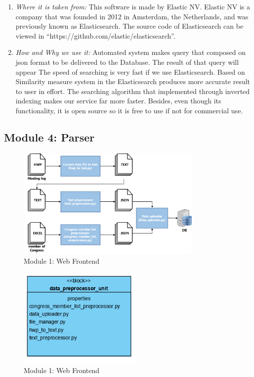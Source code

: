 \documentclass[conference]{IEEEtran}
\begin{document}
\begin{enumerate}
\begin{enumerate}
\end{enumerate}


   \item \textit{Where it is taken from: } This software is made by Elastic NV. Elastic NV is a company that was founded in 2012 in Amsterdam, the Netherlands, and was previously known as Elasticsearch. The source code of Elasticsearch can be viewed in “https://github.com/elastic/elasticsearch”.\\
   
  \item \textit{How and Why we use it: } Automated system makes query that composed on json format to be delivered to the Database. The result of that query will appear The speed of searching is very fast if we use Elasticsearch. Based on Similarity measure system in the Elasticsearch produces more accurate result to user in effort.  The searching algorithm that implemented through inverted indexing makes our service far more faster. Besides, even though its functionality, it is open source so it is free to use if not for commercial use.\\
  \end{enumerate}
 
 
 
 

    \subsection{Module 4: Parser}
\begin{figure}[htbp]
\centerline{\includegraphics[width=90mm,scale=0.5]{fig/6_9.png}}
\caption{Module 1: Web Frontend}
\label{fig}
\end{figure}

\begin{figure}[htbp]
\centerline{\includegraphics[width=60mm,scale=0.5]{fig/6_10.png}}
\caption{Module 1: Web Frontend}
\label{fig}
\end{figure}
\end{document}
